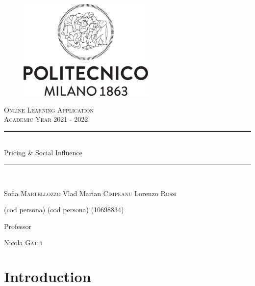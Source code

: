 \documentclass{article}
\begin{document}
\begin{titlepage}
      \centering
      \begin{figure}
            \begin{center}
                  \includegraphics[width=0.6\textwidth]{img/logo_polimi.png}
            \end{center}
      \end{figure}
      \vfill
      {\scshape\LARGE Online Learning Application\\Academic Year 2021 - 2022 \par}
      
      
      \vfill
      \newcommand{\HRule}{\rule{\linewidth}{0.3mm}}
      \centering
      \HRule \\[0.4cm]
      \huge  Pricing \& Social Influence\\%
      \HRule \\
      \vspace{1cm}
      {\Large Sofia \textsc{Martellozzo} \quad  Vlad Marian \textsc{Cimpeanu}  \quad  Lorenzo \textsc{Rossi}\par}
      {\Large(cod persona) \quad (cod persona) \quad (10698834) \par}
      \vfill
      {\large Professor\par
          Nicola \textsc{Gatti}}
\end{titlepage}


\newpage
\renewcommand\contentsname{Contents}
\tableofcontents

\newpage

\section*{Introduction}



\newpage
\end{document}
